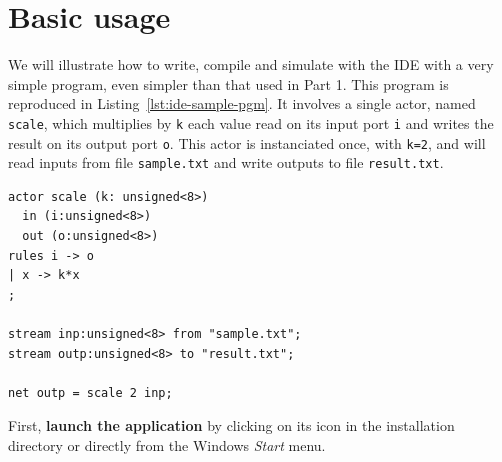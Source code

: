 
\chapter{Basic usage}
\label{cha:ide-basic}

We will illustrate how to write, compile and simulate with the \caph IDE with a very simple \caph
program, even simpler than that used in Part 1. This program is reproduced in
Listing~\ref{lst:ide-sample-pgm}.  It involves a single actor, named \texttt{scale}, which
multiplies by \texttt{k} each value read on its input port \texttt{i} and writes the result on its
output port \texttt{o}. This actor is instanciated once, with \texttt{k=2}, and will read inputs
from file \verb|sample.txt| and write outputs to file \verb|result.txt|.

\begin{lstlisting}[style=CaphStyle,caption={A very simple program for testing the \caph IDE},label={lst:ide-sample-pgm}]
actor scale (k: unsigned<8>)
  in (i:unsigned<8>)
  out (o:unsigned<8>)
rules i -> o
| x -> k*x
;

stream inp:unsigned<8> from "sample.txt";
stream outp:unsigned<8> to "result.txt";

net outp = scale 2 inp;
\end{lstlisting}

\medskip
First, \textbf{launch the \caph application} by clicking on its icon in the installation directory or
directly from the Windows \emph{Start} menu. 

